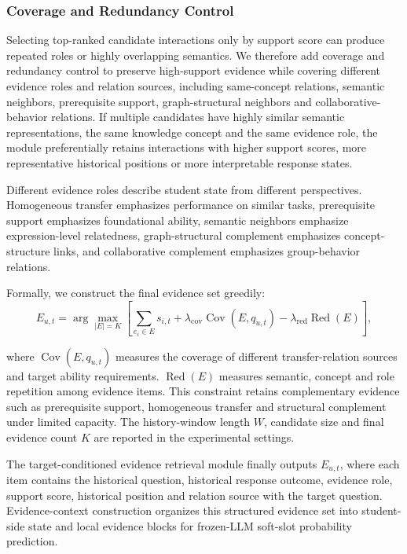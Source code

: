 \documentclass[a4paper,12pt]{article}
\numberwithin{table}{section}
\begin{document}
\subsubsection{Coverage and Redundancy Control}

Selecting top-ranked candidate interactions only by support score can produce repeated roles or highly overlapping semantics. We therefore add coverage and redundancy control to preserve high-support evidence while covering different evidence roles and relation sources, including same-concept relations, semantic neighbors, prerequisite support, graph-structural neighbors and collaborative-behavior relations. If multiple candidates have highly similar semantic representations, the same knowledge concept and the same evidence role, the module preferentially retains interactions with higher support scores, more representative historical positions or more interpretable response states.

Different evidence roles describe student state from different perspectives. Homogeneous transfer emphasizes performance on similar tasks, prerequisite support emphasizes foundational ability, semantic neighbors emphasize expression-level relatedness, graph-structural complement emphasizes concept-structure links, and collaborative complement emphasizes group-behavior relations.

Formally, we construct the final evidence set greedily:
\[
E_{u,t}=\arg\max_{|E|=K}\left[\sum_{e_i\in E}s_{i,t}+\lambda_{\mathrm{cov}}\operatorname{Cov}(E,q_{u,t})-\lambda_{\mathrm{red}}\operatorname{Red}(E)\right],
\]

where \(\operatorname{Cov}(E,q_{u,t})\) measures the coverage of different transfer-relation sources and target ability requirements. \(\operatorname{Red}(E)\) measures semantic, concept and role repetition among evidence items. This constraint retains complementary evidence such as prerequisite support, homogeneous transfer and structural complement under limited capacity. The history-window length \(W\), candidate size and final evidence count \(K\) are reported in the experimental settings.

The target-conditioned evidence retrieval module finally outputs \(E_{u,t}\), where each item contains the historical question, historical response outcome, evidence role, support score, historical position and relation source with the target question. Evidence-context construction organizes this structured evidence set into student-side state and local evidence blocks for frozen-LLM soft-slot probability prediction.
\end{document}
